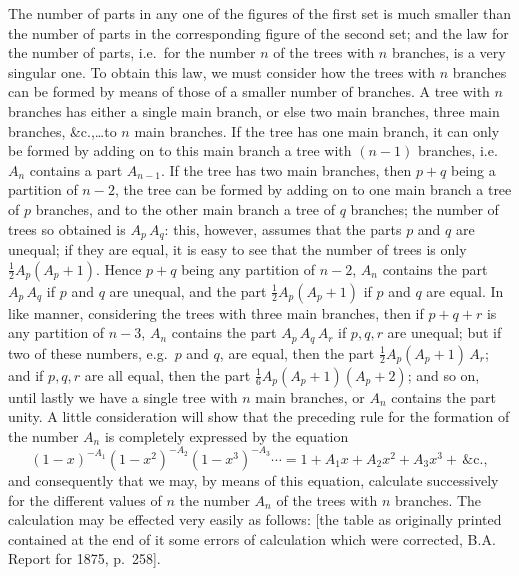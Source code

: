 \documentclass[12pt,a4paper]{article}
\theoremstyle{plain}
\begin{document}
The number of parts in any one of the figures of the first set is much smaller than the number of parts in the corresponding figure of the second set; and the law for the number of parts, i.e.\ for the number $n$ of the trees with $n$ branches, is a very singular one. To obtain this law, we must consider how the trees with $n$ branches can be formed by means of those of a smaller number of branches. A tree with $n$ branches has either a single main branch, or else two main branches, three main branches, \&c.,\ldots to $n$ main branches. If the tree has one main branch, it can only be formed by adding on to this main branch a tree with $(n-1)$ branches, i.e.\ $A_n$ contains a part $A_{n-1}$. If the tree has two main branches, then $p+q$ being a partition of $n-2$, the tree can be formed by adding on to one main branch a tree of $p$ branches, and to the other main branch a tree of $q$ branches; the number of trees so obtained is $A_p\,A_q$: this, however, assumes that the parts $p$ and $q$ are unequal; if they are equal, it is easy to see that the number of trees is only $\tfrac{1}{2}A_p(A_p+1)$. Hence $p+q$ being any partition of $n-2$, $A_n$ contains the part $A_p\,A_q$ if $p$ and $q$ are unequal, and the part $\tfrac{1}{2}A_p(A_p+1)$ if $p$ and $q$ are equal. In like manner, considering the trees with three main branches, then if $p+q+r$ is any partition of $n-3$, $A_n$ contains the part $A_p\,A_q\,A_r$ if $p,q,r$ are unequal; but if two of these numbers, e.g.\ $p$ and $q$, are equal, then the part $\tfrac{1}{2}A_p(A_p+1)\,A_r$; and if $p,q,r$ are all equal, then the part $\tfrac{1}{6}A_p(A_p+1)(A_p+2)$; and so on, until lastly we have a single tree with $n$ main branches, or $A_n$ contains the part unity. A little consideration will show that the preceding rule for the formation of the number $A_n$ is completely expressed by the equation
\[
(1-x)^{-A_1}(1-x^2)^{-A_2}(1-x^3)^{-A_3}\cdots=1+A_1x+A_2x^2+A_3x^3+\,\&\mathrm{c}.,
\]
and consequently that we may, by means of this equation, calculate successively for the different values of $n$ the number $A_n$ of the trees with $n$ branches. The calculation may be effected very easily as follows: [the table as originally printed contained at the end of it some errors of calculation which were corrected, B.A. Report for 1875, p.~258].

\medskip
\end{document}
